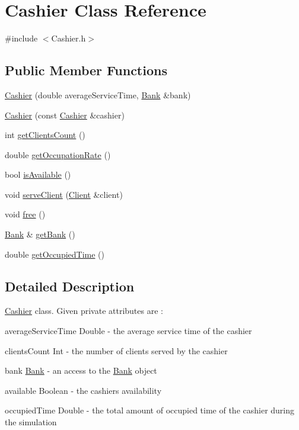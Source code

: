 \hypertarget{classCashier}{}\section{Cashier Class Reference}
\label{classCashier}


{\ttfamily \#include $<$Cashier.\+h$>$}

\subsection*{Public Member Functions}
\begin{DoxyCompactItemize}
\item 
\hyperlink{classCashier_a1616d49e92657698805bb9672df8c019}{Cashier} (double average\+Service\+Time, \hyperlink{classBank}{Bank} \&bank)
\item 
\hyperlink{classCashier_a1a4f6f058122e7c8d47eae5e64334ed6}{Cashier} (const \hyperlink{classCashier}{Cashier} \&cashier)
\item 
int \hyperlink{classCashier_a50d3d5779132b3806958d0e57aea7a34}{get\+Clients\+Count} ()
\item 
double \hyperlink{classCashier_ac0c91ebe2a9ca9428537e79b82bfbe9f}{get\+Occupation\+Rate} ()
\item 
bool \hyperlink{classCashier_a37d66e1a5f77c8f5cb8d77ef0b43e2e8}{is\+Available} ()
\item 
void \hyperlink{classCashier_a98be1361808932fb8a2fa4c294dcf09a}{serve\+Client} (\hyperlink{classClient}{Client} \&client)
\item 
void \hyperlink{classCashier_ac04b7595d1d7e51dd673590809cb5682}{free} ()
\item 
\hyperlink{classBank}{Bank} \& \hyperlink{classCashier_aa60d8270fa27302302b80a810c53a8f9}{get\+Bank} ()
\item 
double \hyperlink{classCashier_a1123f41f1643d9cce2e502243b2aa5b3}{get\+Occupied\+Time} ()
\end{DoxyCompactItemize}


\subsection{Detailed Description}
\hyperlink{classCashier}{Cashier} class. Given private attributes are \+:
\begin{DoxyItemize}
\item average\+Service\+Time Double -\/ the average service time of the cashier
\item clients\+Count Int -\/ the number of clients served by the cashier
\item bank \hyperlink{classBank}{Bank} -\/ an access to the \hyperlink{classBank}{Bank} object
\item available Boolean -\/ the cashier\textquotesingle{}s availability
\item occupied\+Time Double -\/ the total amount of occupied time of the cashier during the simulation 
\end{DoxyItemize}

